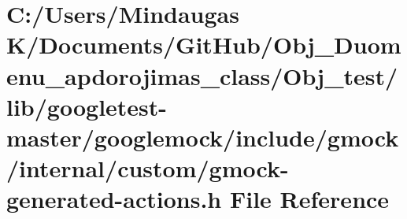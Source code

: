 \hypertarget{_obj__test_2lib_2googletest-master_2googlemock_2include_2gmock_2internal_2custom_2gmock-generated-actions_8h}{}\section{C\+:/\+Users/\+Mindaugas K/\+Documents/\+Git\+Hub/\+Obj\+\_\+\+Duomenu\+\_\+apdorojimas\+\_\+class/\+Obj\+\_\+test/lib/googletest-\/master/googlemock/include/gmock/internal/custom/gmock-\/generated-\/actions.h File Reference}
\label{_obj__test_2lib_2googletest-master_2googlemock_2include_2gmock_2internal_2custom_2gmock-generated-actions_8h}
